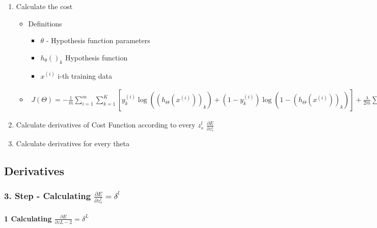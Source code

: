 \begin{enumerate}
\def\labelenumi{\arabic{enumi}.}
\setcounter{enumi}{1}
\tightlist
\item
  Calculate the cost

  \begin{itemize}
  \tightlist
  \item
    Definitions

    \begin{itemize}
    \tightlist
    \item
      \(\theta\) - Hypothesis function parameters
    \item
      \(h_{\theta}()_ {k}\) Hypothesis function
    \item
      \(x^{(i)}\) i-th training data
    \end{itemize}
  \item
    \(\begin{gather*} J(\Theta) = - \frac{1}{m} \sum_{i=1}^m \sum_{k=1}^K \left[y^{(i)}_k \log ((h_\Theta (x^{(i)}))_ k) + (1 - y^{(i)}_k)\log (1 - (h_\Theta(x^{(i)}))_ k)\right] + \frac{\lambda}{2m}\sum_ {l=1}^{L-1} \sum_{i=1}^{s_l} \sum_{j=1}^{s_{l+1}} ( \Theta_{j,i}^{(l)})^2\end{gather*}\)
  \end{itemize}
\item
  Calculate derivatives of Cost Function according to every
  \(z^{l}_{s}\) \(\frac{\partial E}{\partial z^{l}_{s}}\)\\
\item
  Calculate derivatives for every theta
\end{enumerate}

\subsection{Derivatives}\label{derivatives}

\subsubsection{\texorpdfstring{3. Step - Calculating
\(\frac{\partial E}{\partial z^{l}_{s}} = \delta^{l}\)}{3. Step - Calculating \textbackslash{}frac\{\textbackslash{}partial E\}\{\textbackslash{}partial z\^{}\{l\}\_\{s\}\} = \textbackslash{}delta\^{}\{l\}}}\label{step---calculating-fracpartial-epartial-zl_s-deltal}

\paragraph{\texorpdfstring{1 Calculating
\(\frac{\partial E}{\partial z{L-2}} = \delta^{L}\)}{1 Calculating \textbackslash{}frac\{\textbackslash{}partial E\}\{\textbackslash{}partial z\{L-2\}\} = \textbackslash{}delta\^{}\{L\}}}\label{calculating-fracpartial-epartial-zl-2-deltal}


